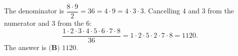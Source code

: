 The denominator is $\dfrac{8\cdot9}{2}=36=4\cdot9=4\cdot3\cdot3$. Cancelling $4$ and $3$ from the numerator and $3$ from the $6$:
\[\dfrac{1\cdot2\cdot3\cdot4\cdot5\cdot6\cdot7\cdot8}{36}=1\cdot2\cdot5\cdot2\cdot7\cdot8=1120.\]
The answer is $\boxed{\textbf{(B) }1120}$.
